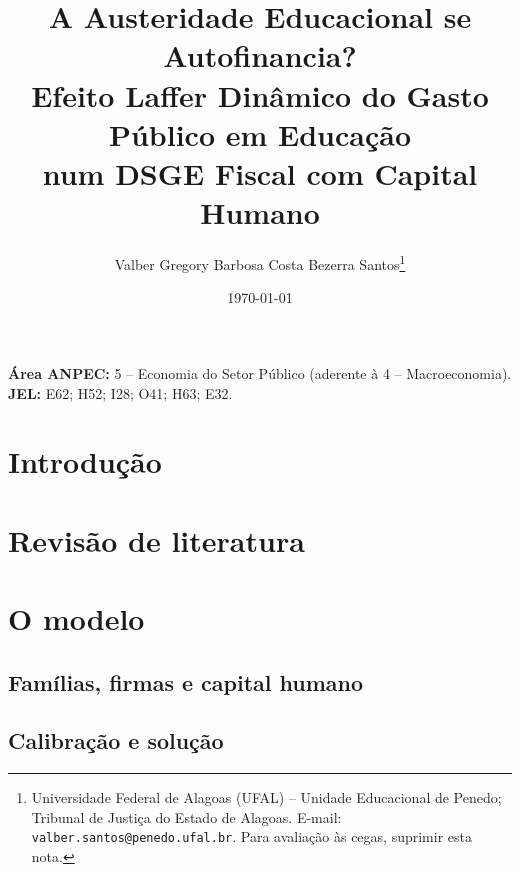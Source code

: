 \documentclass[12pt,a4paper]{article}
\title{\textbf{A Austeridade Educacional se Autofinancia?}\\[2pt]
\textbf{\large Efeito Laffer Din\^amico do Gasto P\'ublico em Educa\c{c}\~ao\\ num DSGE Fiscal com Capital Humano}}
\author{Valber Gregory Barbosa Costa Bezerra Santos\thanks{Universidade Federal de Alagoas (UFAL) -- Unidade Educacional de Penedo; Tribunal de Justi\c{c}a do Estado de Alagoas. E-mail: \texttt{valber.santos@penedo.ufal.br}. Para avalia\c{c}\~ao \`as cegas, suprimir esta nota.}}
\date{\today}
\newcommand{\fonte}[1]{\captionsetup{font=scriptsize}\caption*{\footnotesize Fonte: #1}}
\begin{document}
\maketitle
\begin{center}\small
\textbf{\'Area ANPEC:} 5 -- Economia do Setor P\'ublico (aderente \`a 4 -- Macroeconomia).\\
\textbf{JEL:} E62; H52; I28; O41; H63; E32.
\end{center}

\begin{abstract}
\end{abstract}

\section{Introdu\c{c}\~ao}

\section{Revis\~ao de literatura}

\section{O modelo}\label{sec:modelo}
\subsection{Fam\'ilias, firmas e capital humano}

\subsection{Calibra\c{c}\~ao e solu\c{c}\~ao}

\begin{table}[H]
\centering
\caption{Calibra\c{c}\~ao do modelo}
\label{tab:par}
\small

\fonte{Elabora\c{c}\~ao pr\'opria; refer\^encia a \citet{castro2015samba} e \citet{cavalcantivereda2015}.}
\end{table}
\end{document}
